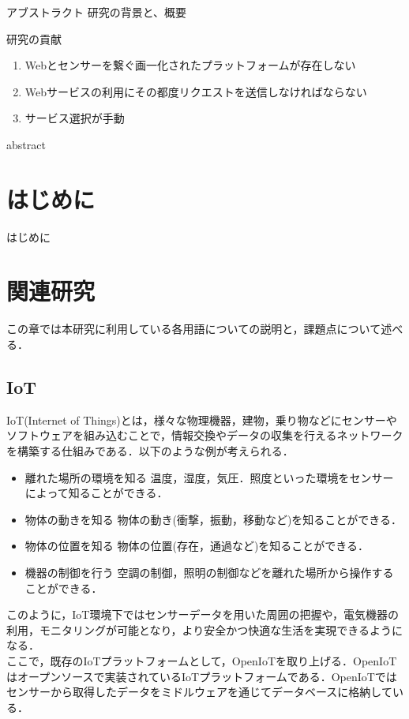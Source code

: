 \documentclass{kuisthesis}			%
\date{平成28年2月6日}				%
\begin{document}
\maketitle					%

\begin{jabstract}				%
アブストラクト
研究の背景と、概要

研究の貢献
\begin{enumerate}
\item
Webとセンサーを繋ぐ画一化されたプラットフォームが存在しない
\item
Webサービスの利用にその都度リクエストを送信しなければならない
\item
サービス選択が手動
\end{enumerate}
\end{jabstract}
\begin{eabstract}				%
abstract

\end{eabstract}

\tableofcontents				%

\section{はじめに}\label{sec-intro}		%
はじめに

\section{関連研究}\label{sec-structure}
この章では本研究に利用している各用語についての説明と，課題点について述べる．

\subsection{IoT}\label{subsec-abstract}
IoT(Internet of Things)とは，様々な物理機器，建物，乗り物などにセンサーやソフトウェアを組み込むことで，情報交換やデータの収集を行えるネットワークを構築する仕組みである．以下のような例が考えられる．
\begin{itemize}
\item 離れた場所の環境を知る
温度，湿度，気圧．照度といった環境をセンサーによって知ることができる．
\item 物体の動きを知る
物体の動き(衝撃，振動，移動など)を知ることができる．
\item 物体の位置を知る
物体の位置(存在，通過など)を知ることができる．
\item 機器の制御を行う
空調の制御，照明の制御などを離れた場所から操作することができる．
\end{itemize}
このように，IoT環境下ではセンサーデータを用いた周囲の把握や，電気機器の利用，モニタリングが可能となり，より安全かつ快適な生活を実現できるようになる．\\
ここで，既存のIoTプラットフォームとして，OpenIoTを取り上げる．OpenIoTはオープンソースで実装されているIoTプラットフォームである．OpenIoTではセンサーから取得したデータをミドルウェアを通じてデータベースに格納している．
\end{document}
